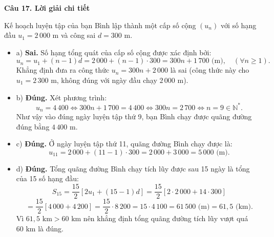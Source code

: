 \documentclass[12pt, a4paper]{article}
\begin{document}
\noindent\textbf{Câu 17. Lời giải chi tiết}\par
\begin{tcolorbox}[enhanced,breakable,colback=solutionbg,colframe=secondary!50!black,frame hidden,borderline west={3pt}{0pt}{secondary!50!black}]
Kế hoạch luyện tập của bạn Bình lập thành một cấp số cộng $(u_n)$ với số hạng đầu $u_1 = 2\,000\text{ m}$ và công sai $d = 300\text{ m}$.
\begin{itemize}[leftmargin=1.5em]
\item a) \textbf{Sai.} Số hạng tổng quát của cấp số cộng được xác định bởi:
$$u_n = u_1 + (n - 1)d = 2\,000 + (n - 1)\cdot 300 = 300n + 1\,700\text{ (m)},\quad (\forall n \ge 1).$$
Khẳng định đưa ra công thức $u_n = 300n + 2\,000$ là sai (công thức này cho $u_1 = 2\,300\text{ m}$, không đúng với ngày đầu chạy $2\,000\text{ m}$).

\item b) \textbf{Đúng.} Xét phương trình:
$$u_n = 4\,400 \Leftrightarrow 300n + 1\,700 = 4\,400 \Leftrightarrow 300n = 2\,700 \Leftrightarrow n = 9 \in \mathbb{N}^*.$$
Như vậy vào đúng ngày luyện tập thứ 9, bạn Bình chạy được quãng đường đúng bằng $4\,400\text{ m}$.

\item c) \textbf{Đúng.} Ở ngày luyện tập thứ 11, quãng đường Bình chạy được là:
$$u_{11} = 2\,000 + (11 - 1)\cdot 300 = 2\,000 + 3\,000 = 5\,000\text{ (m)}.$$

\item d) \textbf{Đúng.} Tổng quãng đường Bình chạy tích lũy được sau 15 ngày là tổng của 15 số hạng đầu:
$$S_{15} = \dfrac{15}{2}\left[2u_1 + (15 - 1)d\right] = \dfrac{15}{2}\left[2\cdot 2\,000 + 14 \cdot 300\right]$$
$$= \dfrac{15}{2}\left[4\,000 + 4\,200\right] = \dfrac{15}{2} \cdot 8\,200 = 15 \cdot 4\,100 = 61\,500\text{ (m)} = 61{,}5\text{ (km)}.$$
Vì $61{,}5\text{ km} > 60\text{ km}$ nên khẳng định tổng quãng đường tích lũy vượt quá $60\text{ km}$ là đúng.
\end{itemize}
\end{tcolorbox}
\end{document}

